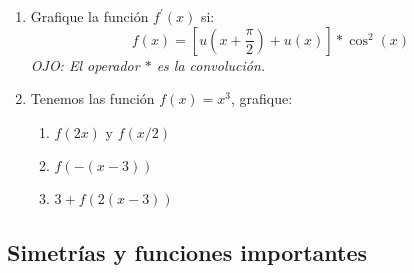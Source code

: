 \documentclass[letterpaper, 12pt]{article}
\newif\ifanswers
\begin{document}
\begin{enumerate}


    \item Grafique la función $f^{'}(x)$ si:
    $$ f(x) = [u(x + \frac{\pi}{2}) + u(x)]*\cos^2(x)$$
     \textit{OJO: El operador $*$ es la convolución.}



         
    \ifanswers
        {\color{red}
        \textbf{Solución:}
    
    Comenzamos con la propiedad de derivación de convolución tal que:
         $$f^{\prime}(x) = [u(x + \frac{\pi}{2}) + u(x)]^{\prime}*\cos^2(x) $$ Dado que la derivada del escalón es un $\delta$. Tenemos que:
         $$f^{\prime}(x) = [\delta(x + \frac{\pi}{2}) + \delta(x)]*\cos^2(x) $$ Por propiedad del cedazo esto es lo mismo que: 
         $$f^{\prime}(x) = \cos^2(x + \frac{\pi}{2}) + \cos^2(x) $$      Recordamos que $\cos^2(x + \frac{\pi}{2}) = \sin^2(x)$ Por lo que $$f^{\prime}(x) = \sin^2(x) + \cos^2(x) = 1 $$ El gráfico es constante en 1.  }
    
         \fi

    \item Tenemos las función $f(x) = x^3$, grafique:
        \begin{enumerate}
            \item $f(2x)$ y $f(x/2)$
            \item $f(-(x- 3))$
            \item $3 + f(2(x- 3))$
        \end{enumerate}
    
        \ifanswers
     {\color{red}\textbf{Solución:}
         \begin{figure}[H]
            \centering
            \texttt{[image: P10/img\_1.png]}
            \caption{Resultado gráfico}
            \label{gato-sol}
        \end{figure}}
        \fi

    
\end{enumerate}

\subsection*{Simetrías y funciones importantes}
\end{document}
